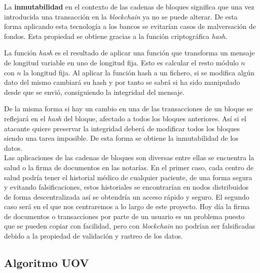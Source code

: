 La \textbf{inmutabilidad} en el contexto de las cadenas de bloques significa que una vez introducida una transacción en la \textit{blockchain} ya no se puede alterar. De esta forma aplicando esta tecnología a los bancos se evitarían casos de malversación de fondos. Esta propiedad se obtiene gracias a la función criptográfica \textit{hash}.

La función \textit{hash} es el resultado de aplicar una función que transforma un mensaje de longitud variable en uno de longitud fija. Esto es calcular el resto módulo $n$ con $n$ la longitud fija. Al aplicar la función hash a un fichero, si se modifica algún dato del mismo cambiará su hash y por tanto se sabrá si ha sido manipulado desde que se envió, consiguiendo la integridad del mensaje.

De la misma forma si hay un cambio en una de las transacciones de un bloque se reflejará en el \textit{hash} del bloque, afectado a todos los bloques anteriores. Así si el atacante quiere preservar la integridad deberá de modificar todos los bloques siendo una tarea imposible. De esta forma se obtiene la inmutabilidad de los datos.\\

Las aplicaciones de las cadenas de bloques son diversas entre ellas se encuentra la salud o la firma de documentos en las notarías. En el primer caso, cada centro  de salud podría tener el historial médico de cualquier paciente, de una forma segura y evitando falsificaciones, estos historiales se encontrarían en nodos distribuidos de forma descentralizada así se obtendría un acceso rápido y seguro. El segundo caso será en el que nos centraremos a lo largo de este proyecto. Hoy día la firma de documentos o transacciones por parte de un usuario es un problema puesto que se pueden copiar con facilidad, pero con \textit{blockchain} no podrían ser falsificadas debido a la propiedad de validación y rastreo de los datos.\\


\subsection{Algoritmo UOV}\label{sec:intro:UOV}


